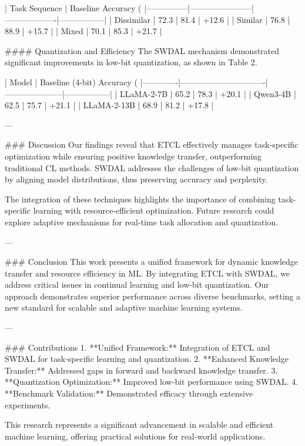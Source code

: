 | Task Sequence | Baseline Accuracy (%
|---------------|-----------------------|-------------------|-----------------|
| Dissimilar    | 72.3                 | 81.4             | +12.6          |
| Similar       | 76.8                 | 88.9             | +15.7          |
| Mixed         | 70.1                 | 85.3             | +21.7          |

#### Quantization and Efficiency
The SWDAL mechanism demonstrated significant improvements in low-bit quantization, as shown in Table 2.

| Model       | Baseline (4-bit) Accuracy (%
|-------------|-------------------------------|---------------------|-----------------|
| LLaMA-2-7B  | 65.2                         | 78.3               | +20.1          |
| Qwen3-4B    | 62.5                         | 75.7               | +21.1          |
| LLaMA-2-13B | 68.9                         | 81.2               | +17.8          |

---

### Discussion
Our findings reveal that ETCL effectively manages task-specific optimization while ensuring positive knowledge transfer, outperforming traditional CL methods. SWDAL addresses the challenges of low-bit quantization by aligning model distributions, thus preserving accuracy and perplexity.

The integration of these techniques highlights the importance of combining task-specific learning with resource-efficient optimization. Future research could explore adaptive mechanisms for real-time task allocation and quantization.

---

### Conclusion
This work presents a unified framework for dynamic knowledge transfer and resource efficiency in ML. By integrating ETCL with SWDAL, we address critical issues in continual learning and low-bit quantization. Our approach demonstrates superior performance across diverse benchmarks, setting a new standard for scalable and adaptive machine learning systems.

---

### Contributions
1. **Unified Framework:** Integration of ETCL and SWDAL for task-specific learning and quantization.
2. **Enhanced Knowledge Transfer:** Addressed gaps in forward and backward knowledge transfer.
3. **Quantization Optimization:** Improved low-bit performance using SWDAL.
4. **Benchmark Validation:** Demonstrated efficacy through extensive experiments.

This research represents a significant advancement in scalable and efficient machine learning, offering practical solutions for real-world applications.